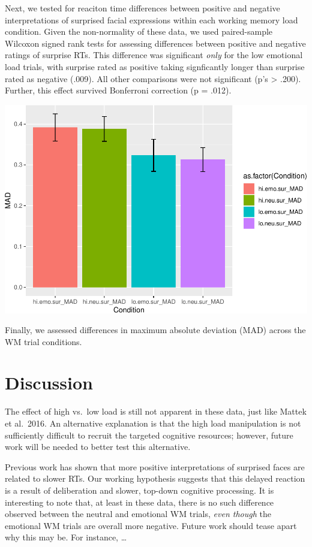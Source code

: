 \documentclass[man]{apa6}
\begin{document}
Next, we tested for reaciton time differences between positive and negative interpretations of surprised facial expressions within each working memory load condition. Given the non-normality of these data, we used paired-sample Wilcoxon signed rank tests for assessing differences between positive and negative ratings of surprise RTs. This difference was significant \emph{only} for the low emotional load trials, with surprise rated as positive taking signficantly longer than surprise rated as negative (.009). All other comparisons were not significant (p's \textgreater{} .200). Further, this effect survived Bonferroni correction (p = .012).

\includegraphics{Manuscript_files/figure-latex/MAD plot-1.pdf}

Finally, we assessed differences in maximum absolute deviation (MAD) across the WM trial conditions.

\hypertarget{discussion}{%
\section{Discussion}\label{discussion}}

The effect of high vs.~low load is still not apparent in these data, just like Mattek et al.~2016. An alternative explanation is that the high load manipulation is not sufficiently difficult to recruit the targeted cognitive resources; however, future work will be needed to better test this alternative.

Previous work has shown that more positive interpretations of surprised faces are related to slower RTs. Our working hypothesis suggests that this delayed reaction is a result of deliberation and slower, top-down cognitive processing. It is interesting to note that, at least in these data, there is no such difference observed between the neutral and emotional WM trials, \emph{even though} the emotional WM trials are overall more negative. Future work should tease apart why this may be. For instance, \ldots{}
\end{document}
